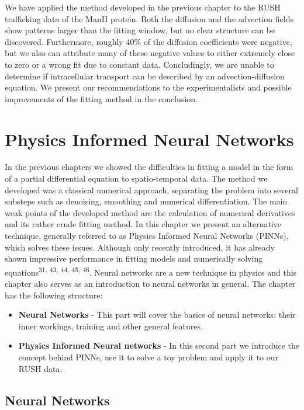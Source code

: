 \documentclass{Dissertate}
\providecommand{\tightlist}{%
  \setlength{\itemsep}{0pt}\setlength{\parskip}{0pt}}
\begin{document}
We have applied the method developed in the previous chapter to the RUSH
trafficking data of the ManII protein. Both the diffusion and the advection fields show patterns larger than the fitting window, but no clear structure can be discovered. Furthermore, roughly 40\% of the diffusion coefficients were negative, but we also can attribute many of these negative values to either extremely close to zero or a wrong fit due to constant data. Concludingly, we are unable to determine if intracellular transport can be described by an advection-diffusion equation. We present our recommendations to the experimentalists and possible improvements of the fitting method in the conclusion. 

\hypertarget{physics-informed-neural-networks}{%
\chapter{Physics Informed Neural
Networks}\label{physics-informed-neural-networks}}

In the previous chapters we showed the difficulties in fitting a model
in the form of a partial differential equation to spatio-temporal data.
The method we developed was a classical numerical approach, separating
the problem into several substeps such as denoising, smoothing and
numerical differentiation. The main weak points of the developed method are the calculation of numerical derivatives and its rather crude fitting method. In this chapter we present an alternative
technique, generally referred to as Physics Informed Neural Networks
(PINNs), which solves these issues. Although only recently introduced, it has already shown impressive performance in fitting
models and numerically solving
equations\textsuperscript{31, 43, 44, 45, 46}.
Neural networks are a new technique in physics and this chapter also
serves as an introduction to neural networks in general. The chapter
has the following structure:

\begin{itemize}
\tightlist
\item
  \textbf{Neural Networks} - This part will cover the basics of neural
  networks: their inner workings, training and other general features.
\item
  \textbf{Physics Informed Neural networks} - In this second part we
  introduce the concept behind PINNs, use it to solve a toy problem and
  apply it to our RUSH data.
\end{itemize}

\newpage
\hypertarget{neural-networks}{%
\section{Neural Networks}\label{neural-networks}}
\end{document}
